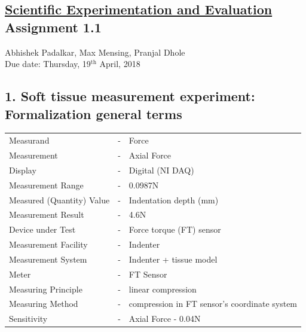 \documentclass[11pt,a4paper,openright,twoside]{extreport}
\begin{document}
\begin{center}
\section*{\underline{Scientific Experimentation and Evaluation}\\{Assignment 1.1}}
\large{Abhishek Padalkar, Max Mensing, Pranjal Dhole}\\
\large{Due date: Thursday, 19$^{\text{th}}$ April, 2018}
\end{center}

\subsection*{1. Soft tissue measurement experiment: Formalization general terms}
\begin{table}[ht]
\centering
\begin{tabular}{lcl}
Measurand &-& Force \\
Measurement &-& Axial Force\\
Display &-& Digital (NI DAQ) \\
Measurement Range &-& 0.0987N \\
Measured (Quantity) Value &-& Indentation depth (mm)\\
Measurement Result &-& 4.6N \\
Device under Test &-& Force torque (FT) sensor \\
Measurement Facility &-& Indenter \\
Measurement System &-& Indenter + tissue model \\
Meter &-& FT Sensor \\
Measuring Principle &-& linear compression \\
Measuring Method &-& compression in FT sensor's coordinate system \\
Sensitivity &-& Axial Force - 0.04N \\
\end{tabular}
\end{table}
\end{document}
